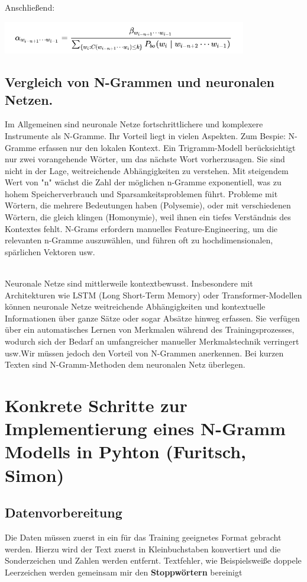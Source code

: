 \documentclass[12pt]{article}
\begin{document}
Anschließend:

\begin{center}
	\includegraphics[width=0.8\textwidth]{statics/Borisov/11.PNG}
\end{center}

\subsection{Vergleich von N-Grammen und neuronalen Netzen.}
\quad Im Allgemeinen sind neuronale Netze fortschrittlichere und komplexere Instrumente als N-Gramme. Ihr Vorteil liegt in vielen Aspekten. Zum Bespie: N-Gramme erfassen nur den lokalen Kontext. Ein Trigramm-Modell berücksichtigt nur zwei vorangehende Wörter, um das nächste Wort vorherzusagen. Sie sind nicht in der Lage, weitreichende Abhängigkeiten zu verstehen. Mit steigendem Wert von "n" wächst die Zahl der möglichen n-Gramme exponentiell, was zu hohem Speicherverbrauch und Sparsamkeitsproblemen führt. Probleme mit Wörtern, die mehrere Bedeutungen haben (Polysemie), oder mit verschiedenen Wörtern, die gleich klingen (Homonymie), weil ihnen ein tiefes Verständnis des Kontextes fehlt. N-Grams erfordern manuelles Feature-Engineering, um die relevanten n-Gramme auszuwählen, und führen oft zu hochdimensionalen, spärlichen Vektoren usw.

\cite{roshmita2023}
\cite{clarkGiorgoloLappin}
\\
Neuronale Netze sind mittlerweile kontextbewusst. Insbesondere mit Architekturen wie LSTM (Long Short-Term Memory) oder Transformer-Modellen können neuronale Netze weitreichende Abhängigkeiten und kontextuelle Informationen über ganze Sätze oder sogar Absätze hinweg erfassen. Sie verfügen über ein automatisches Lernen von Merkmalen während des Trainingsprozesses, wodurch sich der Bedarf an umfangreicher manueller Merkmalstechnik verringert usw.Wir müssen jedoch den Vorteil von N-Grammen anerkennen. Bei kurzen Texten sind N-Gramm-Methoden dem neuronalen Netz überlegen.
\cite{babukumar2010}

\section{Konkrete Schritte zur Implementierung eines N-Gramm Modells in Pyhton (Furitsch, Simon)}
\subsection{Datenvorbereitung}
\quad Die Daten müssen zuerst in ein für das Training geeignetes Format gebracht werden. Hierzu wird der Text zuerst in Kleinbuchstaben konvertiert und die Sonderzeichen und Zahlen werden entfernt. Textfehler, wie Beispielsweiße doppele Leerzeichen werden gemeinsam mir den \textbf{Stoppwörtern} bereinigt
\end{document}
